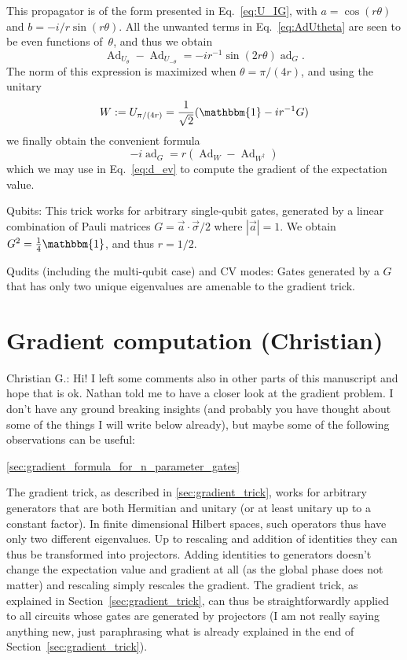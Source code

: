 \documentclass[aps,pra,10pt,twocolumn,groupedaddress,nofootinbib]{revtex4-1}
\theoremstyle{plain}
\DeclareMathOperator{\Ad}{Ad}
\DeclareMathOperator{\ad}{ad}
\newcommand{\be}{\begin{equation}}
\newcommand{\ee}{\end{equation}}
\newcommand{\I}{\mathbbm{1}} %
\newcommand{\cg}[1]{\textcolor{cyan!80!black}{Christian G.: #1}}
\begin{document}


This propagator is of the form presented in Eq.~\eqref{eq:U_IG},
with $a=\cos(r\theta)$ and $b=-i/r \sin(r\theta)$.
All the unwanted terms in Eq.~\eqref{eq:AdUtheta} are seen to be even functions of~$\theta$,
and thus we obtain
\be
\Ad_{U_\theta} -\Ad_{U_{-\theta}}
=
-i r^{-1} \sin(2r\theta) \ad_G.
\ee
The norm of this expression is maximized when $\theta = \pi/(4r)$,
and using the unitary
\be
W := U_{\pi/(4r)} = \frac{1}{\sqrt{2}}(\I -ir^{-1}G)
\ee
we finally obtain the convenient formula
\be
-i\ad_G = r(\Ad_W-\Ad_{W^\dagger})
\ee
which we may use in Eq.~\eqref{eq:d_ev} to compute the gradient of the expectation value.

Qubits:
This trick works for arbitrary single-qubit gates, generated by a linear combination of Pauli matrices
$G = \vec{a} \cdot \vec{\sigma}/2$
where $|\vec{a}|=1$.
We obtain $G^2 = \frac{1}{4} \I$, and thus $r=1/2$.

Qudits (including the multi-qubit case) and CV modes:
Gates generated by a $G$ that has only two unique eigenvalues are amenable to the gradient trick.



\section{Gradient computation (Christian)}
\cg{Hi! I left some comments also in other parts of this manuscript and hope that is ok. Nathan told me to have a closer look at the gradient problem. I don't have any ground breaking insights (and probably you have thought about some of the things I will write below already), but maybe some of the following observations can be useful:}

\ref{sec:gradient_formula_for_n_parameter_gates}

The gradient trick, as described in \ref{sec:gradient_trick}, works for arbitrary generators that are both Hermitian and unitary (or at least unitary up to a constant factor).
In finite dimensional Hilbert spaces, such operators thus have only two different eigenvalues.
Up to rescaling and addition of identities they can thus be transformed into projectors.
Adding identities to generators doesn't change the expectation value and gradient at all (as the global phase does not matter) and rescaling simply rescales the gradient.
The gradient trick, as explained in Section~\ref{sec:gradient_trick}, can thus be straightforwardly applied to all circuits whose gates are generated by projectors (I am not really saying anything new, just paraphrasing what is already explained in the end of Section~\ref{sec:gradient_trick}).
\end{document}

